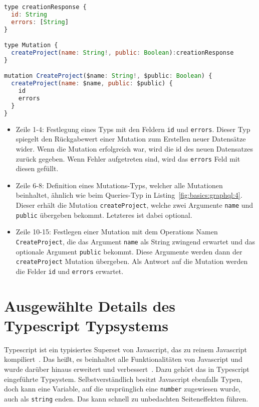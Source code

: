 \begin{lstlisting}[language=Javascript,float=h!,caption={GraphQL Mutation zum Erstellen eines Projektes}, label={fig:basics:graphql:7}]
type creationResponse {
  id: String
  errors: [String]
}

type Mutation {
  createProject(name: String!, public: Boolean):creationResponse
}

mutation CreateProject($name: String!, $public: Boolean) {
  createProject(name: $name, public: $public) {
    id
    errors
  }
}
\end{lstlisting}

\begin{itemize}
	\setlength\itemsep{-1em}
	\item Zeile 1-4: Festlegung eines Typs mit den Feldern \texttt{id} und \texttt{errors}. Dieser Typ spiegelt den Rückgabewert einer Mutation zum Erstellen neuer Datensätze wider. Wenn die Mutation erfolgreich war, wird die id des neuen Datensatzes zurück gegeben. Wenn Fehler aufgetreten sind, wird das \texttt{errors} Feld mit diesen gefüllt.
	\item Zeile 6-8: Definition eines Mutations-Typs, welcher alle Mutationen beinhaltet, ähnlich wie beim Queries-Typ in Listing~\ref{fig:basics:graphql:4}. Dieser erhält die Mutation \texttt{createProject}, welche zwei Argumente \texttt{name} und \texttt{public} übergeben bekommt. Letzteres ist dabei optional.
	\item Zeile 10-15: Festlegen einer Mutation mit dem Operations Namen \texttt{CreateProject}, die das Argument \texttt{name} als String zwingend erwartet und das optionale Argument \texttt{public} bekommt.
	Diese Argumente werden dann der \texttt{createProject} Mutation übergeben.
	Als Antwort auf die Mutation werden die Felder \texttt{id} und \texttt{errors} erwartet.
\end{itemize}

\section{Ausgewählte Details des Typescript Typsystems}
\label{sec:basics:typescript}
Typescript ist ein typisiertes Superset von Javascript, das zu reinem Javascript kompiliert~\cite{typescript}.
Das heißt, es beinhaltet alle Funktionalitäten von Javascript und wurde darüber hinaus erweitert und verbessert~\cite{superset}.
Dazu gehört das in Typescript eingeführte Typsystem. Selbstverständlich besitzt Javascript ebenfalls Typen, doch kann eine Variable,
auf die ursprünglich eine \texttt{number} zugewiesen wurde, auch als \texttt{string} enden. Das kann schnell zu unbedachten Seiteneffekten führen.

